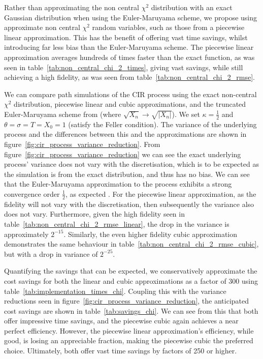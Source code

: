 \documentclass[manuscript,review]{acmart}
\begin{document}
Rather than approximating the non central $ \chi^2 $ distribution with an exact Gaussian distribution when using the Euler-Maruyama scheme, we propose using approximate non central $ \chi^2 $ random variables, such as those from a piecewise linear approximation. This has the benefit of offering vast time savings, whilst introducing far less bias than the Euler-Maruyama scheme. The piecewise linear approximation averages hundreds of times faster than the exact function, as was seen in table~\ref{tab:non_central_chi_2_times}, giving vast savings, while still achieving a high fidelity, as was seen from table~\ref{tab:non_central_chi_2_rmse}.

We can compare path simulations of the CIR process using the exact non-central $ \chi^2 $ distribution, piecewise linear and cubic approximations, and the truncated Euler-Maruyama scheme from \citet{higham2002strong} (where $ \sqrt{X_n} \to \sqrt{\lvert X_n \rvert} $). We set $ \kappa= \tfrac{1}{2}$ and  $ \theta = \sigma =T = X_0 = 1 $ (satisfy the Feller condition). The variance of the underlying process and the differences between this and the approximations are shown in figure~\ref{fig:cir_process_variance_reduction}. From figure~\ref{fig:cir_process_variance_reduction} we can see the exact underlying process' variance does not vary with the discretisation, which is to be expected as the simulation is from the exact distribution, and thus has no bias. We can see that the Euler-Maruyama approximation to the process exhibits a strong convergence order $ \tfrac{1}{2} $, as expected \citep{higham2002strong,gyongy1998note}. For the piecewise linear approximation, as the fidelity will not vary with the discretisation, then subsequently the variance also does not vary. Furthermore, given the high fidelity seen in table~\ref{tab:non_central_chi_2_rmse_linear}, the drop in the variance is approximately $ 2^{-15} $. Similarly, the even higher fidelity cubic approximation demonstrates the same behaviour in table~\ref{tab:non_central_chi_2_rmse_cubic}, but with a drop in variance of $ 2^{-25} $. 

Quantifying the savings that can be expected, we conservatively approximate the cost savings for both the linear and cubic approximations as a factor of 300 using table~\ref{tab:implementation_times_chi}. Coupling this with the variance reductions seen in figure~\ref{fig:cir_process_variance_reduction}, the anticipated cost savings are shown in table~\ref{tab:savings_chi}. We can see from this that both offer impressive time savings, and the piecewise cubic again achieves a near perfect efficiency. However, the piecewise linear approximation's efficiency, while good, is losing an appreciable fraction, making the piecewise cubic the preferred choice. Ultimately, both offer vast time savings by factors of 250 or higher.
\end{document}
